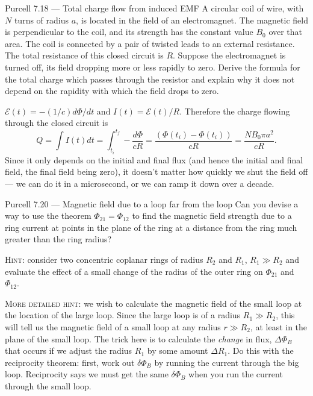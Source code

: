 \documentclass[makesolutionspdf]{esg8022pset}
\begin{document}
\begin{problem}{Purcell 7.18 --- Total charge flow from induced EMF}
  A circular coil of wire, with $N$ turns of radius $a$, is located in the
  field of an electromagnet.  The magnetic field is perpendicular to the coil,
  and its strength has the constant value $B_{0}$ over that area.  The coil is
  connected by a pair of twisted leads to an external resistance. The total
  resistance of this closed circuit is $R$. Suppose the electromagnet is turned
  off, its field dropping more or less rapidly to zero. Derive the formula for
  the total charge which passes through the resistor and explain why it does
  not depend on the rapidity with which the field drops to zero.
\end{problem}
\begin{solution}
  ${\mathcal{E}}(t) = -(1/c)d\Phi/dt$ and $I(t) =
  {\mathcal{E}}(t)/R$.  Therefore the charge flowing through the closed
  circuit is
  \begin{equation}
    Q=\int I(t)dt=\int_{t_{i}}^{t_{f}} -\frac{d\Phi}{cR}
    = \frac{(\Phi(t_{i}) - \Phi(t_{i}))
    }{cR}=\frac{NB_0\pi a^2}{cR}.
  \end{equation}
  Since it only depends on the initial and final flux (and hence the initial
  and final field, the final field being zero), it doesn't matter how quickly
  we shut the field off --- we can do it in a microsecond, or we can ramp it
  down over a decade.
\end{solution}


\begin{problem}{Purcell 7.20 --- Magnetic field due to a loop far from the loop}
  Can you devise a way to use the theorem $\Phi_{21}=\Phi_{12}$ to find the
  magnetic field strength due to a ring current at points in the plane of the
  ring at a distance from the ring much greater than the ring radius?
 
  \noindent \textsc{Hint}: consider two concentric coplanar rings of radius
  $R_{2}$ and $R_{1}$, $R_{1}\gg R_{2}$ and evaluate the effect of a small
  change of the radius of the outer ring on $\Phi_{21}$ and $\Phi_{12}$.
  
  \noindent \textsc{More detailed hint}:  we wish to calculate the magnetic
  field of the small loop at the location of the large loop.  Since the large
  loop is of a radius $R_1 \gg R_2$, this will tell us the magnetic field of a
  small loop at any radius $r \gg R_2$, at least in the plane of the small
  loop. The trick here is to calculate the {\it change} in flux, $\Delta\Phi_B$
  that occurs if we adjust the radius $R_1$ by some amount $\Delta R_1$.  Do
  this with the reciprocity theorem: first, work out $\delta\Phi_B$ by running
  the current through the big loop.  Reciprocity says we must get the same
  $\delta\Phi_B$ when you run the current through the small loop.
\end{problem}
\end{document}
